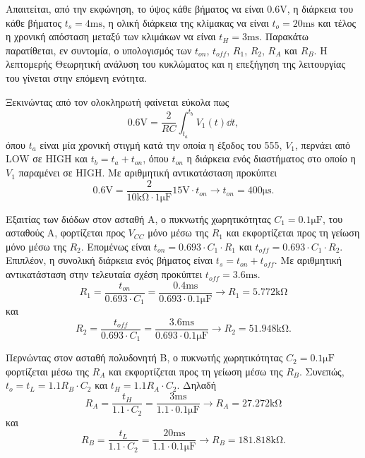 Απαιτείται, από την εκφώνηση, το ύψος κάθε βήματος να είναι $0.6\unit{\volt}$, η διάρκεια του κάθε βήματος $t_s=4\unit{\ms}$, η ολική διάρκεια της κλίμακας να είναι $t_o=20\unit{\ms}$ και τέλος η χρονική απόσταση μεταξύ των κλιμάκων να είναι $t_H=3\unit{\ms}$. Παρακάτω παρατίθεται, εν συντομία, ο υπολογισμός των $t_{on}$, $t_{off}$, $R_1$, $R_2$, $R_A$ και $R_B$. Η λεπτομερής Θεωρητική ανάλυση του κυκλώματος και η επεξήγηση της λειτουργίας του γίνεται στην επόμενη ενότητα.\par
Ξεκινώντας από τον ολοκληρωτή φαίνεται εύκολα πως
\begin{equation*}
	0.6\unit{\volt}=\frac{2}{RC}\int_{t_a}^{t_b}{V_1(t)\dd{t}},
\end{equation*}
όπου $t_a$ είναι μία χρονική στιγμή κατά την οποία η έξοδος του 555, $V_1$, περνάει από LOW σε HIGH και $t_b=t_a+t_{on}$, όπου $t_{on}$ η διάρκεια ενός διαστήματος στο οποίο η $V_1$ παραμένει σε HIGH. Με αριθμητική αντικατάσταση προκύπτει
\begin{equation*}
	0.6\unit{\volt}=\frac{2}{10\unit{\kilo\ohm}\cdot 1\unit{\micro\farad}}15\unit{\volt}\cdot t_{on}\rightarrow t_{on}=400\unit{\micro\second}.
\end{equation*}

Εξαιτίας των διόδων στον ασταθή Α, ο πυκνωτής χωρητικότητας $C_1=0.1\unit{\micro\farad}$, του ασταθούς  Α, φορτίζεται προς $V_{CC}$ μόνο μέσω της $R_1$ και εκφορτίζεται προς τη γείωση μόνο μέσω της $R_2$. Επομένως είναι $t_{on}=0.693\cdot C_1\cdot R_1$ και $t_{off}=0.693\cdot C_1\cdot R_2$. Επιπλέον, η συνολική διάρκεια ενός βήματος είναι $t_s=t_{on}+t_{off}$. Με αριθμητική αντικατάσταση στην τελευταία σχέση προκύπτει $t_{off}=3.6\unit{\ms}$.
\begin{equation*}
	R_1=\frac{t_{on}}{0.693\cdot C_1}=\frac{0.4\unit{\ms}}{0.693\cdot 0.1\unit{\micro\farad}}\rightarrow R_1=5.772\unit{\kilo\ohm}
\end{equation*}
και
\begin{equation*}
	R_2=\frac{t_{off}}{0.693\cdot C_1}=\frac{3.6\unit{\ms}}{0.693\cdot 0.1\unit{\micro\farad}}\rightarrow R_2=51.948\unit{\kilo\ohm}.
\end{equation*}

Περνώντας στον ασταθή πολυδονητή Β, ο πυκνωτής χωρητικότητας $C_2=0.1\unit{\micro\farad}$ φορτίζεται μέσω της $R_A$ και εκφορτίζεται προς τη γείωση μέσω της $R_B$. Συνεπώς, $t_o=t_L=1.1R_B\cdot C_2$ και $t_H=1.1R_A\cdot C_2$. Δηλαδή
\begin{equation*}
	R_Α=\frac{t_{H}}{1.1\cdot C_2}=\frac{3\unit{\ms}}{1.1\cdot 0.1\unit{\micro\farad}}\rightarrow R_A=27.272\unit{\kilo\ohm}
\end{equation*}
και
\begin{equation*}
	R_B=\frac{t_{L}}{1.1\cdot C_2}=\frac{20\unit{\ms}}{1.1\cdot 0.1\unit{\micro\farad}}\rightarrow R_B=181.818\unit{\kilo\ohm}.
\end{equation*}